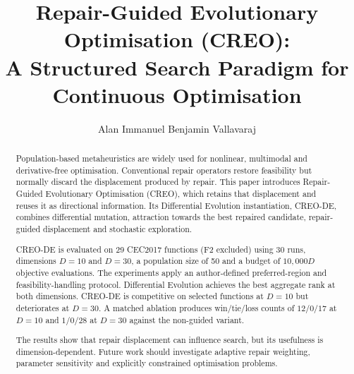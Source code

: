 \documentclass[a4paper,fleqn]{cas-sc}
\begin{document}
\let\WriteBookmarks\relax
\def\floatpagepagefraction{1}
\def\textpagefraction{.001}


\title[mode=title]{Repair-Guided Evolutionary Optimisation (CREO):\\
A Structured Search Paradigm for Continuous Optimisation}

\author[1]{Alan Immanuel Benjamin Vallavaraj}
\cormark[1]



\begin{abstract}
Population-based metaheuristics are widely used for nonlinear, multimodal and derivative-free optimisation. Conventional repair operators restore feasibility but normally discard the displacement produced by repair. This paper introduces Repair-Guided Evolutionary Optimisation (CREO), which retains that displacement and reuses it as directional information. Its Differential Evolution instantiation, CREO-DE, combines differential mutation, attraction towards the best repaired candidate, repair-guided displacement and stochastic exploration.

CREO-DE is evaluated on 29 CEC2017 functions (F2 excluded) using 30 runs, dimensions $D=10$ and $D=30$, a population size of 50 and a budget of $10{,}000D$ objective evaluations. The experiments apply an author-defined preferred-region and feasibility-handling protocol. Differential Evolution achieves the best aggregate rank at both dimensions. CREO-DE is competitive on selected functions at $D=10$ but deteriorates at $D=30$. A matched ablation produces win/tie/loss counts of $12/0/17$ at $D=10$ and $1/0/28$ at $D=30$ against the non-guided variant.

The results show that repair displacement can influence search, but its usefulness is dimension-dependent. Future work should investigate adaptive repair weighting, parameter sensitivity and explicitly constrained optimisation problems.
\end{abstract}
\end{document}
